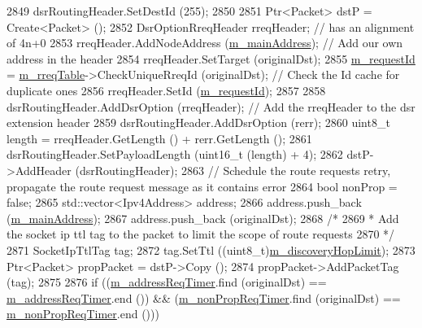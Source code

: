 \begin{DoxyCode}
2849       dsrRoutingHeader.SetDestId (255);
2850 
2851       Ptr<Packet> dstP = Create<Packet> ();
2852       DsrOptionRreqHeader rreqHeader;                                \textcolor{comment}{// has an alignment of 4n+0}
2853       rreqHeader.AddNodeAddress (\hyperlink{classns3_1_1dsr_1_1DsrRouting_a73182b5edee2d8460f28855e058fc9a0}{m\_mainAddress});                     \textcolor{comment}{// Add our own address in
       the header}
2854       rreqHeader.SetTarget (originalDst);
2855       \hyperlink{classns3_1_1dsr_1_1DsrRouting_a4d9ddfed8e907a5885bb5e0f4b41f388}{m\_requestId} = \hyperlink{classns3_1_1dsr_1_1DsrRouting_ae9ec27743735fa2d59cc5190961d1942}{m\_rreqTable}->CheckUniqueRreqId (originalDst);       \textcolor{comment}{// Check the
       Id cache for duplicate ones}
2856       rreqHeader.SetId (\hyperlink{classns3_1_1dsr_1_1DsrRouting_a4d9ddfed8e907a5885bb5e0f4b41f388}{m\_requestId});
2857 
2858       dsrRoutingHeader.AddDsrOption (rreqHeader);         \textcolor{comment}{// Add the rreqHeader to the dsr extension header}
2859       dsrRoutingHeader.AddDsrOption (rerr);
2860       uint8\_t length = rreqHeader.GetLength () + rerr.GetLength ();
2861       dsrRoutingHeader.SetPayloadLength (uint16\_t (length) + 4);
2862       dstP->AddHeader (dsrRoutingHeader);
2863       \textcolor{comment}{// Schedule the route requests retry, propagate the route request message as it contains error}
2864       \textcolor{keywordtype}{bool} nonProp = \textcolor{keyword}{false};
2865       std::vector<Ipv4Address> address;
2866       address.push\_back (\hyperlink{classns3_1_1dsr_1_1DsrRouting_a73182b5edee2d8460f28855e058fc9a0}{m\_mainAddress});
2867       address.push\_back (originalDst);
2868       \textcolor{comment}{/*}
2869 \textcolor{comment}{       * Add the socket ip ttl tag to the packet to limit the scope of route requests}
2870 \textcolor{comment}{       */}
2871       SocketIpTtlTag tag;
2872       tag.SetTtl ((uint8\_t)\hyperlink{classns3_1_1dsr_1_1DsrRouting_acf9cc5a2ae446403b8b57f3340fac178}{m\_discoveryHopLimit});
2873       Ptr<Packet> propPacket = dstP->Copy ();
2874       propPacket->AddPacketTag (tag);
2875 
2876       \textcolor{keywordflow}{if} ((\hyperlink{classns3_1_1dsr_1_1DsrRouting_a47174823b0622573b681afc40d6ea558}{m\_addressReqTimer}.find (originalDst) == 
      \hyperlink{classns3_1_1dsr_1_1DsrRouting_a47174823b0622573b681afc40d6ea558}{m\_addressReqTimer}.end ()) && (\hyperlink{classns3_1_1dsr_1_1DsrRouting_a0936df610f90f7e79c24a2a8cdea6c14}{m\_nonPropReqTimer}.find (originalDst) == 
      \hyperlink{classns3_1_1dsr_1_1DsrRouting_a0936df610f90f7e79c24a2a8cdea6c14}{m\_nonPropReqTimer}.end ()))

\end{DoxyCode}
